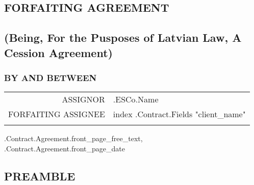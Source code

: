 \documentclass[a4paper]{article}
\begin{document}
\renewcommand\thesection{}
\renewcommand\thesubsection{}
\renewcommand\thesubsubsection{}

\begin{center}

  \vspace*{\fill}
  \section{FORFAITING AGREEMENT}
  \subsection{(Being, For the Pusposes of Latvian Law, A Cession Agreement)}
  \vspace*{\fill}

  \vspace{8cm}

  \subsubsection{BY AND BETWEEN}

  \vspace{1cm}

  \begin{tabu}{|r|X[2]|} \tabucline{}

    ASSIGNOR&{{.ESCo.Name}}\\\tabucline{}

    FORFAITING ASSIGNEE&{{index .Contract.Fields "client_name"}}\\\tabucline{}

  \end{tabu}

  \iffalse input forfaitingFields.front_page_free_text value="{{.Contract.Agreement.front_page_free_text}}" \fi {{.Contract.Agreement.front_page_free_text}}, \iffalse input forfaitingFields.front_page_date value="{{.Contract.Agreement.front_page_date}}" type="date" \fi {{.Contract.Agreement.front_page_date}}

\end{center}

\pagebreak

\begin{center}
	\section{PREAMBLE}
\end{center}
\end{document}
